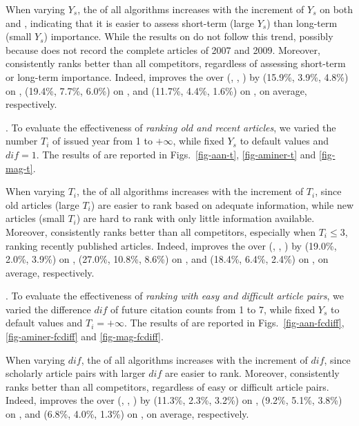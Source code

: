 When varying $Y_s$, the \PairAcc of all algorithms increases with the increment of $Y_s$ on both \aminer and \magdata, indicating that it is easier to assess short-term (large $Y_s$) than long-term (small $Y_s$) importance. While the results on \aan do not follow this trend, possibly because \aan does not record the complete articles of 2007 and 2009.
Moreover, \ensemblerank consistently ranks better than all competitors, regardless of assessing short-term or long-term importance.
Indeed, \ensemblerank improves the \PairAcc over (\pagerank, \futurerank, \hhgrank) by (15.9\%, 3.9\%, 4.8\%) on \aan, (19.4\%, 7.7\%, 6.0\%) on \aminer, and  (11.7\%, 4.4\%, 1.6\%) on \magdata, on average, respectively.



.
To evaluate the effectiveness of {\em ranking old and recent articles},
we varied the number $T_i$ of issued year from 1 to $+\infty$, while fixed $Y_s$ to default values and $dif=1$. The results of \PairAcc are reported in Figs.~\ref{fig-aan-t}, \ref{fig-aminer-t} and \ref{fig-mag-t}.


When varying $T_i$, the \PairAcc of all algorithms increases with the increment of $T_i$, since old articles (large $T_i$) are easier to rank based on adequate information, while new articles (small $T_i$) are hard to rank with only little information available. Moreover, \ensemblerank consistently ranks better than all competitors, especially when $T_i\le3$, \ie ranking recently published articles. Indeed, \ensemblerank improves the \PairAcc over (\pagerank, \futurerank, \hhgrank) by (19.0\%, 2.0\%, 3.9\%) on \aan, (27.0\%, 10.8\%, 8.6\%) on \aminer, and (18.4\%, 6.4\%, 2.4\%) on \magdata, on average, respectively.


.
To evaluate the effectiveness of {\em ranking with easy and difficult article pairs},
we varied the difference $dif$ of future citation counts from 1 to 7, while fixed $Y_s$ to default values and $T_i=+\infty$. The results of \PairAcc are reported in Figs.~\ref{fig-aan-fcdiff}, \ref{fig-aminer-fcdiff} and \ref{fig-mag-fcdiff}.


When varying $dif$, the \PairAcc of all algorithms increases with the increment of $dif$, since scholarly article pairs with larger $dif$ are easier to rank. Moreover, \ensemblerank consistently ranks better than all competitors, regardless of easy or difficult article pairs. Indeed, \ensemblerank improves the \PairAcc over (\pagerank, \futurerank, \hhgrank) by (11.3\%, 2.3\%, 3.2\%) on \aan, (9.2\%, 5.1\%, 3.8\%) on \aminer, and (6.8\%, 4.0\%, 1.3\%) on \magdata, on average, respectively.


